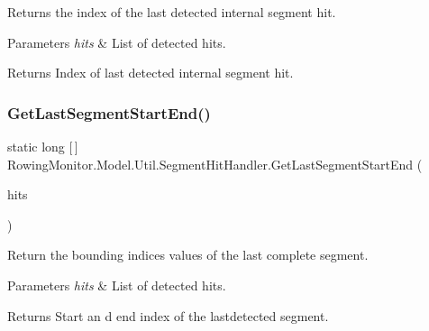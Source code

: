 Returns the index of the last detected internal segment hit. 


\begin{DoxyParams}{Parameters}
{\em hits} & List of detected hits.\\
\hline
\end{DoxyParams}
\begin{DoxyReturn}{Returns}
Index of last detected internal segment hit.
\end{DoxyReturn}
\mbox{\label{class_rowing_monitor_1_1_model_1_1_util_1_1_segment_hit_handler_a75d8b23514da843ef1eebf9e684f8094}} 
\subsubsection{\texorpdfstring{Get\+Last\+Segment\+Start\+End()}{GetLastSegmentStartEnd()}}
{\footnotesize\ttfamily static long \mbox{[}$\,$\mbox{]} Rowing\+Monitor.\+Model.\+Util.\+Segment\+Hit\+Handler.\+Get\+Last\+Segment\+Start\+End (\begin{DoxyParamCaption}\item[{List$<$ \hyperlink{struct_rowing_monitor_1_1_model_1_1_util_1_1_segment_hit}{Segment\+Hit} $>$}]{hits }\end{DoxyParamCaption})\hspace{0.3cm}{\ttfamily [static]}}



Return the bounding indices values of the last complete segment. 


\begin{DoxyParams}{Parameters}
{\em hits} & List of detected hits.\\
\hline
\end{DoxyParams}
\begin{DoxyReturn}{Returns}
Start an d end index of the lastdetected segment.
\end{DoxyReturn}
\mbox{\label{class_rowing_monitor_1_1_model_1_1_util_1_1_segment_hit_handler_afe07b33e8ee385a2320a5e6f05d86215}} 
